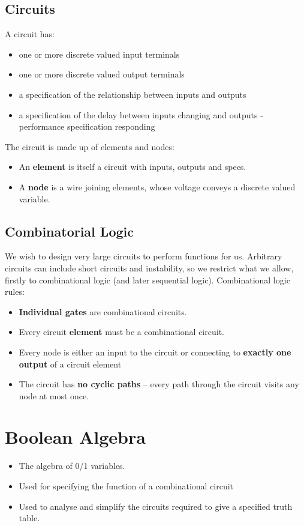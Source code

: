 \documentclass{article}[18pt]
\begin{document}
\subsection{Circuits}
A circuit has:
\begin{itemize}
\item one or more discrete valued input terminals
\item one or more discrete valued output terminals
\item a specification of the relationship between inputs and outputs
\item a specification of the delay between inputs changing and outputs - performance specification
responding
\end{itemize}
The circuit is made up of elements and nodes:
\begin{itemize}
\item An \textbf{element} is itself a circuit with inputs, outputs and specs.
\item A \textbf{node} is a wire joining elements, whose voltage conveys a discrete
valued variable.
\end{itemize}
\subsection{Combinatorial Logic}
We wish to design very large circuits to perform functions for us.
Arbitrary circuits can include short circuits and instability, so we restrict what
we allow, firstly to combinational logic (and later sequential logic). 
Combinational logic rules:
\begin{itemize}
\item \textbf{Individual gates} are combinational circuits.
\item  Every circuit \textbf{element} must be a combinational circuit.
\item  Every node is either an input to the circuit or connecting to \textbf{exactly
one output} of a circuit element
\item  The circuit has\textbf{ no cyclic paths} – every path through the circuit
visits any node at most once.
\end{itemize}
\section{Boolean Algebra}
\begin{itemize}
\item  The algebra of 0/1 variables.
\item  Used for specifying the function of a combinational circuit
\item  Used to analyse and simplify the circuits required to give a specified truth
table.
\end{itemize}
\end{document}
